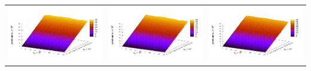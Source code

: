 \documentclass[12pt,a4paper]{article}
\theoremstyle{definition}
\begin{document}
\begin{table}[h]
\begin{tabular}{c c c}
	\includegraphics[scale=0.4]{figs/even/p1.txt_coeff1.dat.pdf} & \includegraphics[scale=0.4]{figs/even/p2.txt_coeff1.dat.pdf} & \includegraphics[scale=0.4]{figs/even/p3.txt_coeff1.dat.pdf} \\

\end{tabular}
\end{table}
\end{document}
